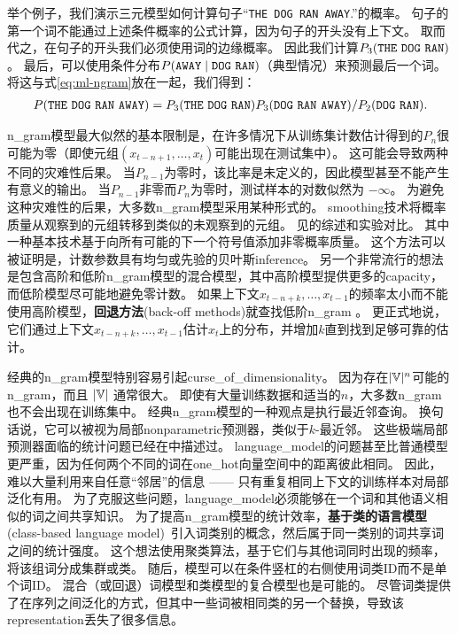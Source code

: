 举个例子，我们演示三元模型如何计算句子``{\tt THE DOG RAN AWAY}.''的概率。
句子的第一个词不能通过上述条件概率的公式计算，因为句子的开头没有上下文。
取而代之，在句子的开头我们必须使用词的边缘概率。
因此我们计算$P_3({\tt THE\ DOG\ RAN})$。
最后，可以使用条件分布$P({\tt AWAY} \mid {\tt DOG\ RAN})$（典型情况）来预测最后一个词。
将这与式\eqref{eq:ml-ngram}放在一起，我们得到：
\begin{align}
P({\tt THE\ DOG\ RAN\ AWAY}) = P_3({\tt THE\ DOG\ RAN}) P_3({\tt DOG\ RAN\ AWAY}) / P_2({\tt DOG\ RAN}).
\end{align}

\gls{n_gram}模型最大似然的基本限制是，在许多情况下从训练集计数估计得到的$P_n$很可能为零（即使元组$(x_{t-n+1},  \dots, x_{t})$可能出现在测试集中）。
这可能会导致两种不同的灾难性后果。
当$P_{n-1}$为零时，该比率是未定义的，因此模型甚至不能产生有意义的输出。
当$P_{n-1}$非零而$P_n$为零时，测试样本的对数似然为 $-\infty$。
为避免这种灾难性的后果，大多数\gls{n_gram}模型采用某种形式的。
\gls{smoothing}技术将概率质量从观察到的元组转移到类似的未观察到的元组。
见\citet{Chen+Goodman99}的综述和实验对比。
其中一种基本技术基于向所有可能的下一个符号值添加非零概率质量。
这个方法可以被证明是，计数参数具有均匀或先验的贝叶斯\gls{inference}。
另一个非常流行的想法是包含高阶和低阶\gls{n_gram}模型的混合模型，其中高阶模型提供更多的\gls{capacity}，而低阶模型尽可能地避免零计数。
如果上下文$x_{t-n+k}, \ldots, x_{t-1}$的频率太小而不能使用高阶模型，\textbf{回退方法}(back-off methods)就查找低阶\gls{n_gram} 。
更正式地说，它们通过上下文$x_{t-n+k}, \ldots, x_{t-1}$估计$x_t$上的分布，并增加$k$直到找到足够可靠的估计。


经典的\gls{n_gram}模型特别容易引起\gls{curse_of_dimensionality}。
因为存在$|\mathbb{V}|^n$可能的\gls{n_gram}，而且 $|\mathbb{V}|$ 通常很大。
即使有大量训练数据和适当的$n$，大多数\gls{n_gram}也不会出现在训练集中。
经典\gls{n_gram}模型的一种观点是执行最近邻查询。
换句话说，它可以被视为局部\gls{nonparametric}预测器，类似于$k$-最近邻。
这些极端局部预测器面临的统计问题已经在中描述过。
\gls{language_model}的问题甚至比普通模型更严重，因为任何两个不同的词在\gls{one_hot}向量空间中的距离彼此相同。
因此，难以大量利用来自任意``邻居''的信息 —— 只有重复相同上下文的训练样本对局部泛化有用。
为了克服这些问题，\gls{language_model}必须能够在一个词和其他语义相似的词之间共享知识。
为了提高\gls{n_gram}模型的统计效率，\textbf{基于类的语言模型}(class-based language model)~\citep{Brown92,Ney+Kneser93,Niesler98}引入词类别的概念，然后属于同一类别的词共享词之间的统计强度。
这个想法使用聚类算法，基于它们与其他词同时出现的频率，将该组词分成集群或类。
随后，模型可以在条件竖杠的右侧使用词类ID而不是单个词ID。
混合（或回退）词模型和类模型的复合模型也是可能的。
尽管词类提供了在序列之间泛化的方式，但其中一些词被相同类的另一个替换，导致该\gls{representation}丢失了很多信息。

